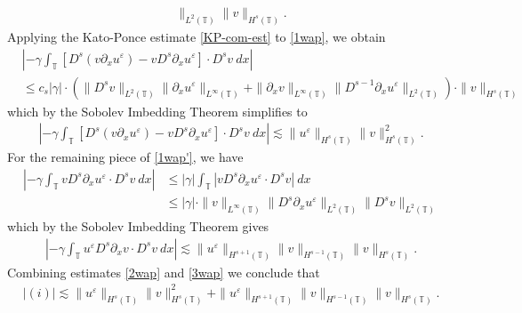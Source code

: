 \documentclass[12pt,reqno]{amsart}
\newcommand{\p}{\partial}
\newcommand{\ci}{\mathbb{T}}
\newcommand{\ee}{\varepsilon}
\theoremstyle{plain}  %
\theoremstyle{definition}
\begin{document}
\begin{appendices}
\begin{equation}
\begin{split}
			\|_{L^2(\ci)} \|v\|_{H^s(\ci)}.
			\label{1wap}
		\end{split}
	\end{equation}
	Applying the Kato-Ponce estimate \eqref{KP-com-est} to \eqref{1wap}, we
	obtain
	\begin{equation*}
		\begin{split}
			& | -\gamma \int_\ci \left[ D^s(v \p_x u^\ee) - v D^s
			\p_x u^\ee \right] \cdot D^s v \ dx |
			\\
			& \le c_s |\gamma| \cdot ( \|D^s v \|_{L^2(\ci)} \|\p_x
			u^\ee\|_{L^\infty(\ci)} + \|\p_x v \|_{L^\infty(\ci)} \|D^{s-1}
			\p_x u^\ee \|_{L^2(\ci)}) \cdot \|v\|_{H^s(\ci)}
		\end{split}
	\end{equation*}
	which by the Sobolev Imbedding Theorem simplifies to
	\begin{equation}
		\begin{split}
			| -\gamma \int_\ci \left[ D^s(v \p_x u^\ee ) - v D^s
			\p_x u^\ee \right] \cdot D^s v \ dx |
			\lesssim \|u^\ee \|_{H^s(\ci)} \|v\|_{H^s(\ci)}^2.
			\label{2wap}
		\end{split}
	\end{equation}
	For the remaining piece of \eqref{1wap'}, we have
	\begin{equation*}
		\begin{split}
			| - \gamma \int_\ci v D^s \p_x u^\ee \cdot D^s v \ dx |
			& \le |\gamma| \int_\ci |v D^s \p_x u^\ee \cdot D^s v | \ dx
			\\
			& \le |\gamma| \cdot \|v\|_{L^\infty(\ci)} \|D^s \p_x u^\ee
			\|_{L^2(\ci)} \|D^s v\|_{L^2(\ci)}
		\end{split}
	\end{equation*}
	which by the Sobolev Imbedding Theorem gives 
	\begin{equation}
		\begin{split}
			| - \gamma \int_\ci u^\ee D^s \p_x v \cdot D^s v \ dx |
			\lesssim \|u^\ee \|_{H^{s+1}(\ci)} \|v\|_{H^{s-1}(\ci)}
			\|v\|_{H^s(\ci)}.
			\label{3wap}
		\end{split}
	\end{equation}
	Combining estimates \eqref{2wap} and \eqref{3wap} we conclude that
	\begin{equation}
		\begin{split}
			|(i)| \lesssim \|u^\ee \|_{H^s(\ci)} \|v\|_{H^s(\ci)}^2 + 
			\|u^\ee \|_{H^{s+1}(\ci)} \|v\|_{H^{s-1}(\ci)}
			\|v\|_{H^s(\ci)}.
			\label{4wap}
		\end{split}
	\end{equation}

\end{appendices}
\end{document}
